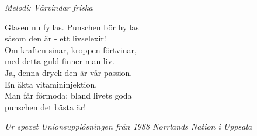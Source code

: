 {\footnotesize\textit{Melodi: Vårvindar friska}}\par
\vspace{10pt}
Glasen nu fyllas. Punschen bör hyllas\\
såsom den är - ett livselexir!\\
Om kraften sinar, kroppen förtvinar,\\
med detta guld finner man liv.\\
Ja, denna dryck den är vår passion.\\
En äkta vitamininjektion.\\
Man får förmoda; bland livets goda\\
punschen det bästa är!\par
\vspace{10pt}
{\footnotesize\textit{Ur spexet Unionsupplösningen från 1988 Norrlands Nation i Uppsala}}

